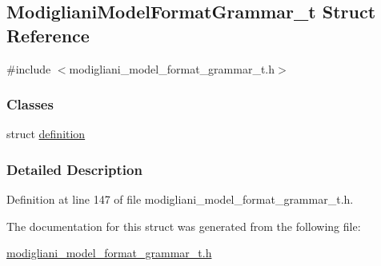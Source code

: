 \subsection{ModiglianiModelFormatGrammar\_\-t Struct Reference}
\label{struct_modigliani_model_format_grammar__t}


{\ttfamily \#include $<$modigliani\_\-model\_\-format\_\-grammar\_\-t.h$>$}

\subsubsection*{Classes}
\begin{DoxyCompactItemize}
\item 
struct \hyperlink{struct_modigliani_model_format_grammar__t_1_1definition}{definition}
\end{DoxyCompactItemize}


\subsubsection{Detailed Description}


Definition at line 147 of file modigliani\_\-model\_\-format\_\-grammar\_\-t.h.



The documentation for this struct was generated from the following file:\begin{DoxyCompactItemize}
\item 
\hyperlink{modigliani__model__format__grammar__t_8h}{modigliani\_\-model\_\-format\_\-grammar\_\-t.h}\end{DoxyCompactItemize}

